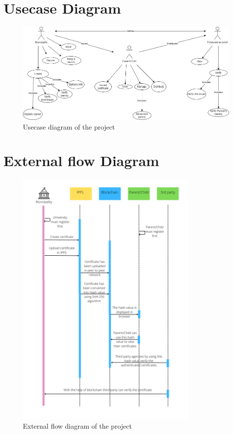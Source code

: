 \vspace{1cm}

    \section{Usecase Diagram}
    \begin{figure}[H]
        \centering
        \includegraphics[width=\textwidth]{imgs/Use_case_diagram.png}
        \caption{Usecase diagram of the project}
        \label{fig:Usecase diagram of the project}
        \end{figure}
    

    \section{External flow Diagram}
\begin{figure}[H]
    \centering
    \includegraphics[width=0.80\textwidth]{imgs/External_flow.png}
    \caption{External flow diagram of the project}
    \label{fig:External flow diagram of the project}
    \end{figure}

